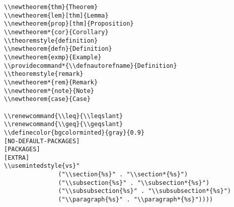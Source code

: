 \documentclass[c]{article}
\theoremstyle{plain}%
\theoremstyle{definition}
\providecommand*{\defnautorefname}{Definition}
\theoremstyle{remark}
\renewcommand{\leq}{\leqslant}
\renewcommand{\geq}{\geqslant}
\begin{document}
\begin{verbatim}
\\newtheorem{thm}{Theorem}
\\newtheorem{lem}[thm]{Lemma}
\\newtheorem{prop}[thm]{Proposition}
\\newtheorem*{cor}{Corollary}
\\theoremstyle{definition}
\\newtheorem{defn}{Definition}
\\newtheorem{exmp}{Example}
\\providecommand*{\\defnautorefname}{Definition}
\\theoremstyle{remark}
\\newtheorem*{rem}{Remark}
\\newtheorem*{note}{Note}
\\newtheorem{case}{Case}

\\renewcommand{\\leq}{\\leqslant}
\\renewcommand{\\geq}{\\geqslant}
\\definecolor{bgcolorminted}{gray}{0.9}
[NO-DEFAULT-PACKAGES]
[PACKAGES]
[EXTRA]
\\usemintedstyle{vs}"
               ("\\section{%s}" . "\\section*{%s}")
               ("\\subsection{%s}" . "\\subsection*{%s}")
               ("\\subsubsection{%s}" . "\\subsubsection*{%s}")
               ("\\paragraph{%s}" . "\\paragraph*{%s}"))))
\end{verbatim}
\end{document}
